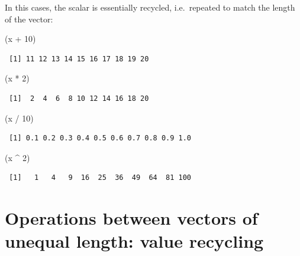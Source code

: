 \documentclass[
]{book}
\newenvironment{Shaded}{\begin{snugshade}}{\end{snugshade}}
\newcommand{\DecValTok}[1]{\textcolor[rgb]{0.00,0.00,0.81}{#1}}
\newcommand{\NormalTok}[1]{#1}
\newcommand{\SpecialCharTok}[1]{\textcolor[rgb]{0.00,0.00,0.00}{#1}}
\begin{document}
In this cases, the scalar is essentially recycled, i.e.~repeated to match the length of the vector:

\begin{Shaded}
\begin{Highlighting}[]
\NormalTok{(x }\SpecialCharTok{+} \DecValTok{10}\NormalTok{)}
\end{Highlighting}
\end{Shaded}

\begin{verbatim}
 [1] 11 12 13 14 15 16 17 18 19 20
\end{verbatim}

\begin{Shaded}
\begin{Highlighting}[]
\NormalTok{(x }\SpecialCharTok{*} \DecValTok{2}\NormalTok{)}
\end{Highlighting}
\end{Shaded}

\begin{verbatim}
 [1]  2  4  6  8 10 12 14 16 18 20
\end{verbatim}

\begin{Shaded}
\begin{Highlighting}[]
\NormalTok{(x }\SpecialCharTok{/} \DecValTok{10}\NormalTok{)}
\end{Highlighting}
\end{Shaded}

\begin{verbatim}
 [1] 0.1 0.2 0.3 0.4 0.5 0.6 0.7 0.8 0.9 1.0
\end{verbatim}

\begin{Shaded}
\begin{Highlighting}[]
\NormalTok{(x }\SpecialCharTok{\^{}} \DecValTok{2}\NormalTok{)}
\end{Highlighting}
\end{Shaded}

\begin{verbatim}
 [1]   1   4   9  16  25  36  49  64  81 100
\end{verbatim}

\hypertarget{operations-between-vectors-of-unequal-length-value-recycling}{%
\section{\texorpdfstring{Operations between vectors of unequal length: \textbf{value recycling}}{Operations between vectors of unequal length: value recycling}}\label{operations-between-vectors-of-unequal-length-value-recycling}}
\end{document}

